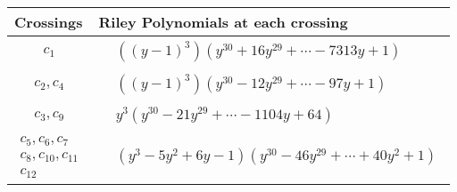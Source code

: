 \documentclass[1p]{elsarticle_modified}
\theoremstyle{definition}
\begin{document}
\begin{tabular}{m{50pt}|m{274pt}}
Crossings & \hspace{64pt}Riley Polynomials at each crossing \\
\hline $$\begin{aligned}c_{1}\end{aligned}$$&$\begin{aligned}
&((y-1)^3)(y^{30}+16 y^{29}+\cdots-7313 y+1)
\end{aligned}$\\
\hline $$\begin{aligned}c_{2},c_{4}\end{aligned}$$&$\begin{aligned}
&((y-1)^3)(y^{30}-12 y^{29}+\cdots-97 y+1)
\end{aligned}$\\
\hline $$\begin{aligned}c_{3},c_{9}\end{aligned}$$&$\begin{aligned}
&y^3(y^{30}-21 y^{29}+\cdots-1104 y+64)
\end{aligned}$\\
\hline $$\begin{aligned}c_{5},c_{6},c_{7}\\c_{8},c_{10},c_{11}\\c_{12}\end{aligned}$$&$\begin{aligned}
&(y^3-5 y^2+6 y-1)(y^{30}-46 y^{29}+\cdots+40 y^2+1)
\end{aligned}$\\
\hline
\end{tabular}
\vskip 2pc
\end{document}
